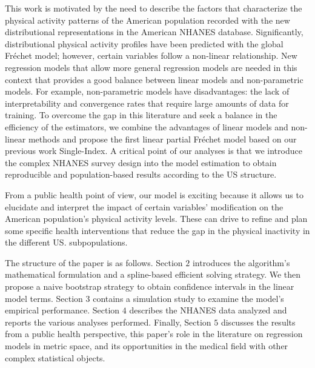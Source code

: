 \documentclass{article}
\begin{document}
This work is motivated by the need to describe the factors that characterize the physical activity patterns of the American population recorded with the new distributional representations in the American NHANES database. Significantly, distributional physical activity profiles have been predicted with the global Fréchet model; however, certain variables follow a non-linear relationship. New regression models that allow more general regression models are needed in this context that provides a good balance between linear models and non-parametric models. For example, non-parametric models have disadvantages: the lack of interpretability and convergence rates that require large amounts of data for training. To overcome the gap in this literature and seek a balance in the efficiency of the estimators, we combine the advantages of linear models and non-linear methods and propose the first linear partial Fréchet model based on our previous work Single-Index. A critical point of our analyses is that we introduce the complex NHANES survey design into the model estimation to obtain reproducible and population-based results according to the US structure.  

From a public health point of view, our model is exciting because it allows us to elucidate and interpret the impact of certain variables' modification on the American population's physical activity levels. These can drive to refine and plan some specific health interventions that reduce the gap in the physical inactivity in the different US. subpopulations.

The structure of the paper is as follows. Section $2$ introduces the algorithm's mathematical formulation and a spline-based efficient solving strategy. We then propose a naive bootstrap strategy to obtain confidence intervals in the linear model terms. Section $3$ contains a simulation study to examine the model's empirical performance. Section $4$ describes the NHANES data analyzed and reports the various analyses performed. Finally, Section $5$ discusses the results from a public health perspective, this paper's role in the literature on regression models in metric space, and its opportunities in the medical field with other complex statistical objects. 
\end{document}
